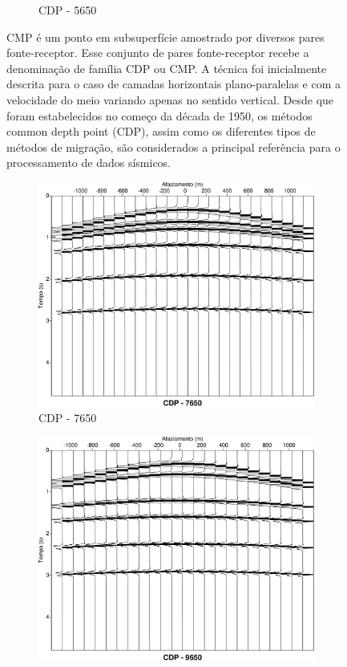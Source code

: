 \begin{landscape}
\begin{figure}[H]
\begin{subfigure}[b]{.80\textwidth}
        \caption{CDP - 5650}
        \label{fig:figure_b}
    \end{subfigure}
    \caption{CMP é um ponto em subsuperfície amostrado por diversos pares fonte-receptor. Esse conjunto de pares fonte-receptor recebe a denominação de família CDP ou CMP. A técnica foi inicialmente descrita para o caso de camadas horizontais plano-paralelas e com a velocidade do meio variando apenas no sentido vertical. Desde que foram estabelecidos no começo da década de 1950, os métodos common depth point (CDP), assim como os diferentes tipos de métodos de migração, são considerados a principal referência para o processamento de dados sísmicos.}
    \label{fig:fig_cdp1}
\end{figure}
\end{landscape}
\begin{landscape}
\begin{figure}[H]
    \centering
    \begin{subfigure}[b]{.80\textwidth}
        \centering
        \includegraphics[width=12cm]{figuras/cap2/cmp7650.pdf}
        \caption{CDP - 7650}
        \label{fig:figure_c}
    \end{subfigure}%
    \begin{subfigure}[b]{.80\textwidth}
        \centering
        \includegraphics[width=12cm]{figuras/cap2/cmp9650.pdf}

\end{subfigure}
\end{figure}
\end{landscape}
